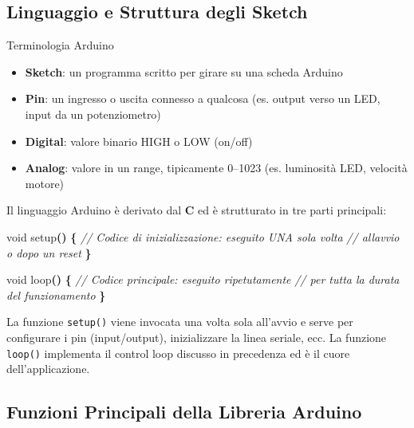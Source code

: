 \documentclass[
  italian,
  openany]{book}
\newenvironment{Shaded}{\begin{snugshade}}{\end{snugshade}}
\newcommand{\CommentTok}[1]{\textcolor[rgb]{0.56,0.35,0.01}{\textit{#1}}}
\newcommand{\DataTypeTok}[1]{\textcolor[rgb]{0.13,0.29,0.53}{#1}}
\newcommand{\NormalTok}[1]{#1}
\newcommand{\OperatorTok}[1]{\textcolor[rgb]{0.81,0.36,0.00}{\textbf{#1}}}
\providecommand{\tightlist}{%
  \setlength{\itemsep}{0pt}\setlength{\parskip}{0pt}}
\begin{document}
\subsection{Linguaggio e Struttura degli
Sketch}\label{linguaggio-e-struttura-degli-sketch}

\begin{calloutdefinition}{Terminologia Arduino}

\begin{itemize}
\tightlist
\item
  \textbf{Sketch}: un programma scritto per girare su una scheda Arduino
\item
  \textbf{Pin}: un ingresso o uscita connesso a qualcosa (es. output
  verso un LED, input da un potenziometro)
\item
  \textbf{Digital}: valore binario HIGH o LOW (on/off)
\item
  \textbf{Analog}: valore in un range, tipicamente 0--1023 (es.
  luminosità LED, velocità motore)
\end{itemize}

\end{calloutdefinition}

Il linguaggio Arduino è derivato dal \textbf{C} ed è strutturato in tre
parti principali:

\begin{Shaded}
\begin{Highlighting}[]
\DataTypeTok{void}\NormalTok{ setup}\OperatorTok{()} \OperatorTok{\{}
  \CommentTok{// Codice di inizializzazione: eseguito UNA sola volta}
  \CommentTok{// all\textquotesingle{}avvio o dopo un reset}
\OperatorTok{\}}

\DataTypeTok{void}\NormalTok{ loop}\OperatorTok{()} \OperatorTok{\{}
  \CommentTok{// Codice principale: eseguito ripetutamente}
  \CommentTok{// per tutta la durata del funzionamento}
\OperatorTok{\}}
\end{Highlighting}
\end{Shaded}

La funzione \texttt{setup()} viene invocata una volta sola all'avvio e
serve per configurare i pin (input/output), inizializzare la linea
seriale, ecc. La funzione \texttt{loop()} implementa il control loop
discusso in precedenza ed è il cuore dell'applicazione.

\subsection{Funzioni Principali della Libreria
Arduino}\label{funzioni-principali-della-libreria-arduino}
\end{document}
